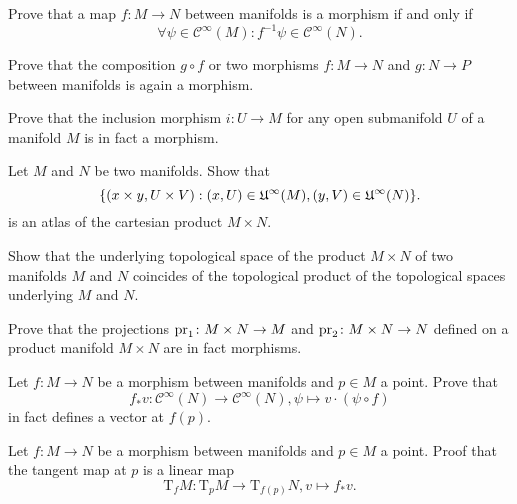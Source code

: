 \begin{xca}
  Prove that a map $f\colon M \to N$ between manifolds is a morphism if and only if
  \[
    \forall \psi \in \mathcal C^\infty(M):
    f^{-1} \psi \in \mathcal C^\infty(N).
  \]
\end{xca}

\begin{xca}
  Prove that the composition $g \circ f$ or two morphisms $f\colon M \to N$
  and $g\colon N \to P$ between manifolds is again a morphism.
\end{xca}

\begin{xca}
  Prove that the inclusion morphism $i\colon U \to M$ for any open submanifold
  $U$ of a manifold $M$ is in fact a morphism.
\end{xca}

\begin{xca}
  Let $M$ and $N$ be two manifolds. Show that 
  \[
    \lbrace(x \times y, U \times V): (x, U) \in \mathfrak U^\infty(M),
      (y, V) \in \mathfrak U^\infty(N)\rbrace.
  \]
  is an atlas of the cartesian product $M \times N$.
\end{xca}

\begin{xca}
  Show that the underlying topological space of the product $M \times N$ of
  two manifolds $M$ and $N$ coincides of the topological product of the topological 
  spaces underlying $M$ and $N$.
\end{xca}

\begin{xca}
  Prove that the projections $\mathrm{pr}_1\colon M \times N \to M$ and $\mathrm{pr}_2\colon
  M \times N \to N$ defined on a product manifold $M \times N$ are in fact
  morphisms.
\end{xca}

\begin{xca}
  Let $f\colon M \to N$ be a morphism between manifolds and $p \in M$ a point.
  Prove that
  \[
    f_* v\colon \mathcal C^\infty(N) \to \mathcal C^\infty(N),
    \psi \mapsto v \cdot (\psi \circ f)
  \]
  in fact defines a vector at $f(p)$.
\end{xca}

\begin{xca}
  Let $f\colon M \to N$ be a morphism between manifolds and $p \in M$ a point.
  Proof that the tangent map at $p$ is a linear map
  \[
    \mathrm T_f M\colon \mathrm T_p M \to \mathrm T_{f(p)} N, v \mapsto f_* v.
  \]  
\end{xca}

